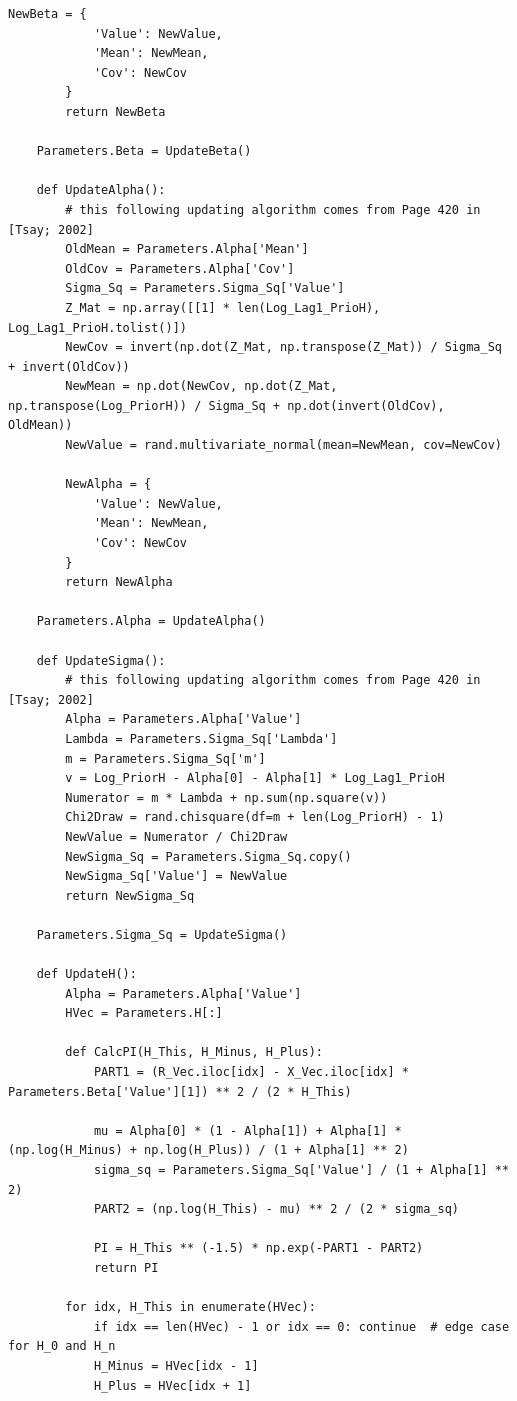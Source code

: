 \documentclass[letterpaper]{article}
\begin{document}
\begin{lstlisting}[label=lst:pythoncode]
        NewBeta = {
            'Value': NewValue,
            'Mean': NewMean,
            'Cov': NewCov
        }
        return NewBeta

    Parameters.Beta = UpdateBeta()

    def UpdateAlpha():
        # this following updating algorithm comes from Page 420 in [Tsay; 2002]
        OldMean = Parameters.Alpha['Mean']
        OldCov = Parameters.Alpha['Cov']
        Sigma_Sq = Parameters.Sigma_Sq['Value']
        Z_Mat = np.array([[1] * len(Log_Lag1_PrioH), Log_Lag1_PrioH.tolist()])
        NewCov = invert(np.dot(Z_Mat, np.transpose(Z_Mat)) / Sigma_Sq + invert(OldCov))
        NewMean = np.dot(NewCov, np.dot(Z_Mat, np.transpose(Log_PriorH)) / Sigma_Sq + np.dot(invert(OldCov), OldMean))
        NewValue = rand.multivariate_normal(mean=NewMean, cov=NewCov)

        NewAlpha = {
            'Value': NewValue,
            'Mean': NewMean,
            'Cov': NewCov
        }
        return NewAlpha

    Parameters.Alpha = UpdateAlpha()

    def UpdateSigma():
        # this following updating algorithm comes from Page 420 in [Tsay; 2002]
        Alpha = Parameters.Alpha['Value']
        Lambda = Parameters.Sigma_Sq['Lambda']
        m = Parameters.Sigma_Sq['m']
        v = Log_PriorH - Alpha[0] - Alpha[1] * Log_Lag1_PrioH
        Numerator = m * Lambda + np.sum(np.square(v))
        Chi2Draw = rand.chisquare(df=m + len(Log_PriorH) - 1)
        NewValue = Numerator / Chi2Draw
        NewSigma_Sq = Parameters.Sigma_Sq.copy()
        NewSigma_Sq['Value'] = NewValue
        return NewSigma_Sq

    Parameters.Sigma_Sq = UpdateSigma()

    def UpdateH():
        Alpha = Parameters.Alpha['Value']
        HVec = Parameters.H[:]

        def CalcPI(H_This, H_Minus, H_Plus):
            PART1 = (R_Vec.iloc[idx] - X_Vec.iloc[idx] * Parameters.Beta['Value'][1]) ** 2 / (2 * H_This)

            mu = Alpha[0] * (1 - Alpha[1]) + Alpha[1] * (np.log(H_Minus) + np.log(H_Plus)) / (1 + Alpha[1] ** 2)
            sigma_sq = Parameters.Sigma_Sq['Value'] / (1 + Alpha[1] ** 2)
            PART2 = (np.log(H_This) - mu) ** 2 / (2 * sigma_sq)

            PI = H_This ** (-1.5) * np.exp(-PART1 - PART2)
            return PI

        for idx, H_This in enumerate(HVec):
            if idx == len(HVec) - 1 or idx == 0: continue  # edge case for H_0 and H_n
            H_Minus = HVec[idx - 1]
            H_Plus = HVec[idx + 1]


\end{lstlisting}
\end{document}
